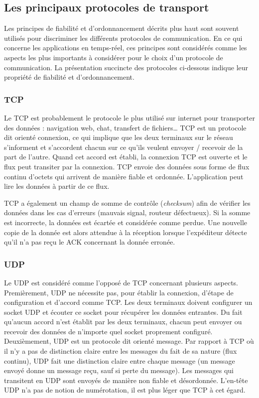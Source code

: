 \subsection{Les principaux protocoles de transport}
Les principes de fiabilité et d'ordonnancement décrits plus haut sont souvent 
utilisés pour discriminer les différents protocoles de communication. En ce qui concerne les 
applications en temps-réel, ces principes sont considérés comme les aspects les plus 
importants à considérer pour le choix d'un protocole de communication. La 
présentation succincte des protocoles ci-dessous indique leur propriété de 
fiabilité et d'ordonnancement.
\subsubsection{TCP}
Le \gls{TCP} est probablement le protocole le plus utilisé sur internet pour 
transporter des données : navigation web, chat, transfert de fichiers\dots 
\gls{TCP} est un protocole dit \og orienté connexion\fg{}, ce qui implique que les 
deux terminaux sur le réseau s'informent et s'accordent chacun sur ce qu'ils 
veulent envoyer / recevoir de la part de l'autre. 
Quand cet accord est établi, la connexion \gls{TCP} est ouverte et le flux peut 
transiter par la connexion. 
\gls{TCP} envoie des données sous forme de flux continu d'octets qui arrivent de 
manière fiable et ordonnée. 
L'application peut lire les données à partir de ce flux.

\gls{TCP} a également un champ de somme de contrôle (\textit{checksum}) afin 
de vérifier les données dans les cas d'erreurs (mauvais signal, routeur 
défectueux). 
Si la somme est incorrecte, la données est écartée et considérée comme perdue. 
Une nouvelle copie de la donnée est alors attendue à la réception lorsque 
l'expéditeur détecte qu'il n'a pas reçu le ACK concernant la donnée erronée.

\subsubsection{UDP}
Le \gls{UDP} est considéré comme l'opposé de \gls{TCP} concernant plusieurs 
aspects. Premièrement, \gls{UDP} ne nécessite pas, pour établir la connexion, d'étape de configuration et d'accord comme \gls{TCP}. Les deux terminaux doivent 
configurer un socket \gls{UDP} et écouter ce socket pour récupérer les données 
entrantes. Du fait qu'aucun accord n'est établit par les deux terminaux, chacun 
peut envoyer ou recevoir des données de n'importe quel socket proprement 
configuré.
Deuxièmement, \gls{UDP} est un protocole dit \og orienté message\fg{}. Par 
rapport à \gls{TCP} où il n'y a pas de distinction claire entre les messages du fait 
de sa nature (flux continu), \gls{UDP} fait une distinction claire entre chaque 
message (un message envoyé donne un message reçu, sauf si perte du 
message). Les messages qui transitent en \gls{UDP} sont envoyés de manière 
non fiable et désordonnée. L'en-tête \gls{UDP} n'a pas de notion de numérotation, il 
est plus léger que \gls{TCP} à cet égard.

